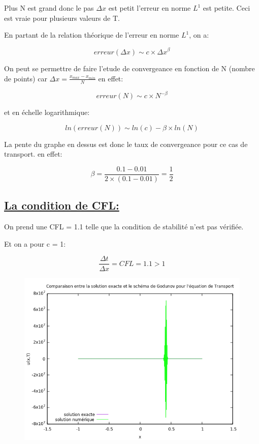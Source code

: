 Plus N est grand donc le pas $\Delta x$ est petit l'erreur en norme $L^1$ est petite. Ceci est vraie pour plusieurs valeurs de T. 

En partant de la relation th\'eorique de l'erreur en norme $L^1$, on a:

$$erreur(\Delta x) \sim c \times {\Delta x}^{\beta}$$

On peut se permettre de faire l'etude de convergeance en fonction de N (nombre de points) car $\Delta x = \frac{x_{max} - x_{min} }{N}$ 
en effet:

$$erreur(N) \sim c \times N^{-\beta}$$

et en \'echelle logarithmique:

$$ln(erreur(N)) \sim ln(c) -\beta \times ln(N)$$


La pente du graphe en dessus est donc le taux de convergeance pour ce cas de transport. en effet:

$$ \beta = \frac{0.1-0.01}{2\times (0.1-0.01)} =  \frac{1}{2}$$

\subsection[La condition de CFL]{\uline{La condition de CFL:}}
On prend une CFL = 1.1 telle que la condition de stabilit\'e n'est pas v\'erifi\'ee.

Et on a pour c = 1:

$$\frac {\Delta t}{\Delta x } = CFL = 1.1 > 1$$
\newpage
\begin{figure}[h!]
	\centering \includegraphics[scale=0.7]{Images_Fichiers/godu2.png}
\end{figure}

